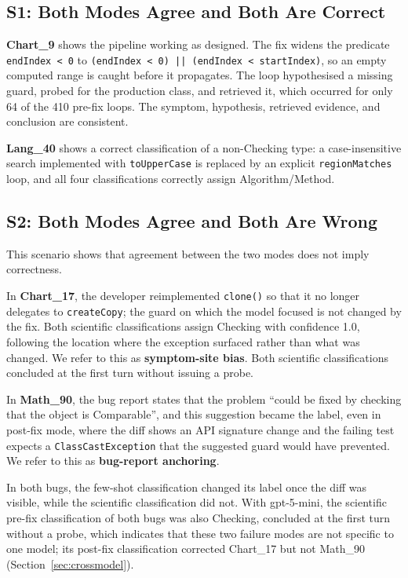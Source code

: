 \documentclass{iutbscthesis}
\begin{document}
\subsection{S1: Both Modes Agree and Both Are Correct}

\textbf{Chart\_9} shows the pipeline working as designed. The fix widens the predicate \texttt{endIndex < 0} to \texttt{(endIndex < 0) || (endIndex < startIndex)}, so an empty computed range is caught before it propagates. The loop hypothesised a missing guard, probed for the production class, and retrieved it, which occurred for only 64 of the 410 pre-fix loops. The symptom, hypothesis, retrieved evidence, and conclusion are consistent.

\textbf{Lang\_40} shows a correct classification of a non-Checking type: a case-insensitive search implemented with \texttt{toUpperCase} is replaced by an explicit \texttt{region\allowbreak Matches} loop, and all four classifications correctly assign Algorithm/Method.

\subsection{S2: Both Modes Agree and Both Are Wrong}

This scenario shows that agreement between the two modes does not imply correctness.

In \textbf{Chart\_17}, the developer reimplemented \texttt{clone()} so that it no longer delegates to \texttt{createCopy}; the guard on which the model focused is not changed by the fix. Both scientific classifications assign Checking with confidence 1.0, following the location where the exception surfaced rather than what was changed. We refer to this as \textbf{symptom-site bias}. Both scientific classifications concluded at the first turn without issuing a probe.

In \textbf{Math\_90}, the bug report states that the problem ``could be fixed by checking that the object is Comparable'', and this suggestion became the label, even in post-fix mode, where the diff shows an API signature change and the failing test expects a \texttt{Class\allowbreak Cast\allowbreak Exception} that the suggested guard would have prevented. We refer to this as \textbf{bug-report anchoring}.

In both bugs, the few-shot classification changed its label once the diff was visible, while the scientific classification did not. With gpt-5-mini, the scientific pre-fix classification of both bugs was also Checking, concluded at the first turn without a probe, which indicates that these two failure modes are not specific to one model; its post-fix classification corrected Chart\_17 but not Math\_90 (Section~\ref{sec:crossmodel}).
\end{document}
